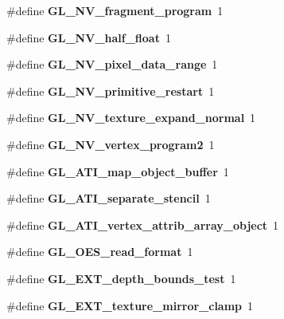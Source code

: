 \begin{DoxyCompactItemize}
\item 
\#define {\bfseries G\+L\+\_\+\+N\+V\+\_\+fragment\+\_\+program}~1\label{_s_d_l__opengl_8h_a3e9d81424503986192252b7015d304bb}

\item 
\#define {\bfseries G\+L\+\_\+\+N\+V\+\_\+half\+\_\+float}~1\label{_s_d_l__opengl_8h_a80ab2fac66e306c628eeca294b0edeb2}

\item 
\#define {\bfseries G\+L\+\_\+\+N\+V\+\_\+pixel\+\_\+data\+\_\+range}~1\label{_s_d_l__opengl_8h_a8d84d979477c94c653a18e26fcf54eb1}

\item 
\#define {\bfseries G\+L\+\_\+\+N\+V\+\_\+primitive\+\_\+restart}~1\label{_s_d_l__opengl_8h_a81a9a9d6ae4c34a230b3b8615a0409ff}

\item 
\#define {\bfseries G\+L\+\_\+\+N\+V\+\_\+texture\+\_\+expand\+\_\+normal}~1\label{_s_d_l__opengl_8h_aaf1bdebdae9d9dffffc8965c0a4aee68}

\item 
\#define {\bfseries G\+L\+\_\+\+N\+V\+\_\+vertex\+\_\+program2}~1\label{_s_d_l__opengl_8h_ab26dbe1d6deb547f67ce3d1304b633aa}

\item 
\#define {\bfseries G\+L\+\_\+\+A\+T\+I\+\_\+map\+\_\+object\+\_\+buffer}~1\label{_s_d_l__opengl_8h_abf04edf0b5ec82043e070d67eddd1016}

\item 
\#define {\bfseries G\+L\+\_\+\+A\+T\+I\+\_\+separate\+\_\+stencil}~1\label{_s_d_l__opengl_8h_a532fc25b5b040b2c76f6d4c59980a458}

\item 
\#define {\bfseries G\+L\+\_\+\+A\+T\+I\+\_\+vertex\+\_\+attrib\+\_\+array\+\_\+object}~1\label{_s_d_l__opengl_8h_abf7fa794c7635627ce501f4738db3d58}

\item 
\#define {\bfseries G\+L\+\_\+\+O\+E\+S\+\_\+read\+\_\+format}~1\label{_s_d_l__opengl_8h_a8023eda95b8581de8cf2590fd1b0ba5a}

\item 
\#define {\bfseries G\+L\+\_\+\+E\+X\+T\+\_\+depth\+\_\+bounds\+\_\+test}~1\label{_s_d_l__opengl_8h_ab74f5cdfd8e6494a7c25fea5dd0fac6c}

\item 
\#define {\bfseries G\+L\+\_\+\+E\+X\+T\+\_\+texture\+\_\+mirror\+\_\+clamp}~1\label{_s_d_l__opengl_8h_a1aee22b7b448c4907a38750d7d3524b0}


\end{DoxyCompactItemize}
